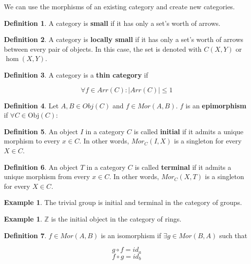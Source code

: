 \documentclass{article}
\theoremstyle{definition}
\newtheorem{definition}{Definition}
\newtheorem{example}[theorem]{Example}
\newcommand{\Z}{\mathbb{Z}}
\newcommand{\obj}{\text{Obj}}
\begin{document}
We can use the morphisms of an existing category and create new
categories. 

\newpage

\begin{definition}
    A category is \textbf{small} if it has only a set's worth of arrows.
\end{definition}

\begin{definition}
    A category is \textbf{locally small} if it has only a set's worth of 
    arrows between every pair of objects. In this case, the set is denoted
    with $C(X,Y)$ or $\hom(X,Y)$.
\end{definition}

\begin{definition}
    A category is a \textbf{thin category} if 

    \[ \forall f \in Arr(C): \lvert Arr(C) \rvert \leq 1\]
\end{definition}

\begin{definition}
    Let $A,B \in Obj(C)$ and $f \in Mor(A,B)$. $f$ is an \textbf{epimorphism}
    if $\forall C \in \obj(C): $
\end{definition}

\begin{definition}
    An object $I$ in a category $C$ is called \textbf{initial} if it admits
    a unique morphism to every $x \in C$. In other words, $Mor_{C}(I,X)$
    is a singleton for every $X \in C$.
\end{definition}

\begin{definition}
    An object $T$ in a category $C$ is called \textbf{terminal} if it admits
    a unique morphism from every $x \in C$. In other words, $Mor_{C}(X,T)$
    is a singleton for every $X \in C$.
\end{definition}

\begin{example}
    The trivial group is initial and terminal in the category of groups.
\end{example}

\begin{example}
    $\Z$ is the initial object in the category of rings.
\end{example}

\begin{definition}
    $f \in Mor(A,B)$ is an isomorphism if $\exists g \in Mor(B,A)$ such that

    \[ g \circ f = id_{a} \]
    \[ f \circ g = id_{b} \]
\end{definition}
\end{document}
